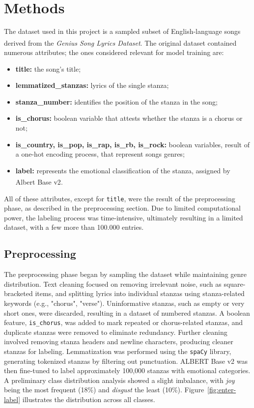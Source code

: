 \chapter*{Methods}
\label{ch:capitolo2}
The dataset used in this project is a sampled subset of English-language
songs derived from the \textit{Genius Song Lyrics Dataset}\textsuperscript{\cite{geniusdataset}}.
The original dataset contained numerous attributes; the ones considered
relevant for model training are:
\begin{itemize}
    \item \textbf{title:} the song's title;
    
    \item \textbf{lemmatized\_stanzas:} lyrics of the single stanza;
    
    \item \textbf{stanza\_number:} identifies the position of the stanza in the song;

    \item \textbf{is\_chorus:} boolean variable that attests whether the stanza is
        a chorus or not;
    
    \item \textbf{is\_country, is\_pop, is\_rap, is\_rb, is\_rock:} boolean variables, result of a one-hot encoding process, that represent songs genres;

    \item \textbf{label:} represents the emotional classification of the stanza,
        assigned by Albert Base v2\textsuperscript{\cite{albert-base-v2}}.
\end{itemize}
All of these attributes, except for \texttt{title}, were the result
of the preprocessing phase, as described in the preprocessing section.
Due to limited computational power, the labeling process was time-intensive,
ultimately resulting in a limited dataset, with a few more than 100.000 entries.

\section*{Preprocessing}
\label{preprocessing}
The preprocessing phase began by sampling the dataset while maintaining genre
distribution. Text cleaning focused on removing irrelevant noise, such as
square-bracketed items, and splitting lyrics into individual stanzas using
stanza-related keywords (e.g., "chorus", "verse").
Uninformative stanzas, such as empty or very short ones, were discarded,
resulting in a dataset of numbered stanzas.
A boolean feature, \texttt{is\_chorus}, was added to mark repeated or chorus-related
stanzas, and duplicate stanzas were removed to eliminate redundancy.
Further cleaning involved removing stanza headers and newline characters,
producing cleaner stanzas for labeling.
Lemmatization was performed using the \texttt{spaCy} library, generating
tokenized stanzas by filtering out punctuation. ALBERT Base v2 was then
fine-tuned to label approximately 100,000 stanzas with emotional categories.
A preliminary class distribution analysis showed a slight imbalance, with
\textit{joy} being the most frequent (18\%) and \textit{disgust} the least (10\%).
Figure~\ref{fig:enter-label} illustrates the distribution across all classes.


